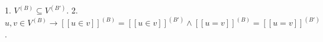 1. $V^{(B)} \subseteq V^{(B')}$.
2. $u, v \in V^{(B)} \rightarrow [[u \in v]]^{(B)} = [[u \in v]]^{(B')} \wedge [[u = v]]^{(B)} = [[u = v]]^{(B')}$.
